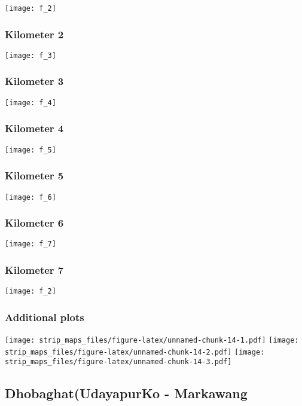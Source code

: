 \documentclass[]{article}
\begin{document}
\texttt{[image: f\_2]}

\subsubsection{Kilometer 2}\label{kilometer-2-5}

\texttt{[image: f\_3]}

\subsubsection{Kilometer 3}\label{kilometer-3-5}

\texttt{[image: f\_4]}

\subsubsection{Kilometer 4}\label{kilometer-4-5}

\texttt{[image: f\_5]}

\subsubsection{Kilometer 5}\label{kilometer-5-5}

\texttt{[image: f\_6]}

\subsubsection{Kilometer 6}\label{kilometer-6-5}

\texttt{[image: f\_7]}

\subsubsection{Kilometer 7}\label{kilometer-7-4}

\texttt{[image: f\_2]}

\subsubsection{Additional plots}\label{additional-plots-5}

\texttt{[image: strip\_maps\_files/figure-latex/unnamed-chunk-14-1.pdf]}
\texttt{[image: strip\_maps\_files/figure-latex/unnamed-chunk-14-2.pdf]}
\texttt{[image: strip\_maps\_files/figure-latex/unnamed-chunk-14-3.pdf]}

\newpage

\subsection{Dhobaghat(UdayapurKo -
Markawang}\label{dhobaghatudayapurko---markawang}
\end{document}
